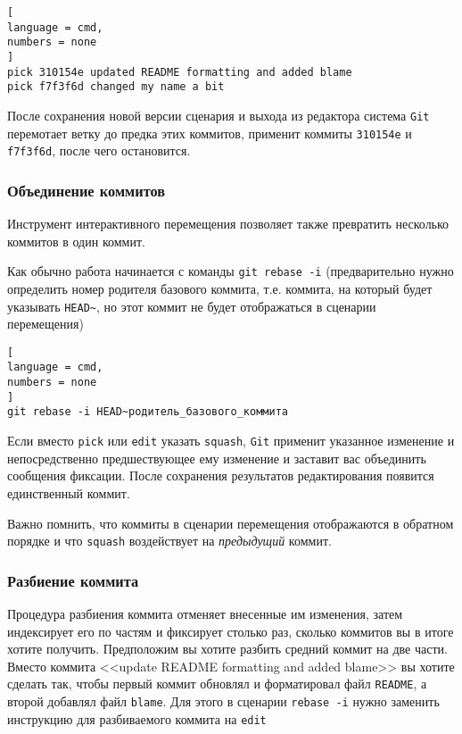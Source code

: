 \documentclass[%
	11pt,
	a4paper,
	utf8,
		]{article}
\begin{document}
\begin{lstlisting}[
language = cmd,
numbers = none
]
pick 310154e updated README formatting and added blame
pick f7f3f6d changed my name a bit
\end{lstlisting}

После сохранения новой версии сценария и выхода из редактора система \texttt{Git} перемотает ветку до предка этих коммитов, применит коммиты \texttt{310154e} и \texttt{f7f3f6d}, после чего остановится.

\subsubsection{Объединение коммитов}

Инструмент интерактивного перемещения позволяет также превратить несколько коммитов в один коммит.

Как обычно работа начинается с команды \texttt{git rebase -i} (предварительно нужно определить номер родителя базового коммита, т.е. коммита, на который будет указывать \texttt{HEAD\~}, но этот коммит не будет отображаться в сценарии перемещения)
\begin{lstlisting}[
language = cmd,
numbers = none
]
git rebase -i HEAD~родитель_базового_коммита
\end{lstlisting}

Если вместо \texttt{pick} или \texttt{edit} указать \texttt{squash}, \texttt{Git} применит указанное изменение и непосредственно предшествующее ему изменение и заставит вас объединить сообщения фиксации. После сохранения результатов редактирования появится единственный коммит.

Важно помнить, что коммиты в сценарии перемещения отображаются в обратном порядке и что \texttt{squash} воздействует на \emph{предыдущий} коммит.

\subsubsection{Разбиение коммита}

Процедура разбиения коммита отменяет внесенные им изменения, затем индексирует его по частям и фиксирует столько раз, сколько коммитов вы в итоге хотите получить. Предположим вы хотите разбить средний коммит на две части. Вместо коммита <<update README formatting and added blame>> вы хотите сделать так, чтобы первый коммит обновлял и форматировал файл \texttt{README}, а второй добавлял файл \texttt{blame}. Для этого в сценарии \texttt{rebase -i} нужно заменить инструкцию для разбиваемого коммита на \texttt{edit}
\end{document}

